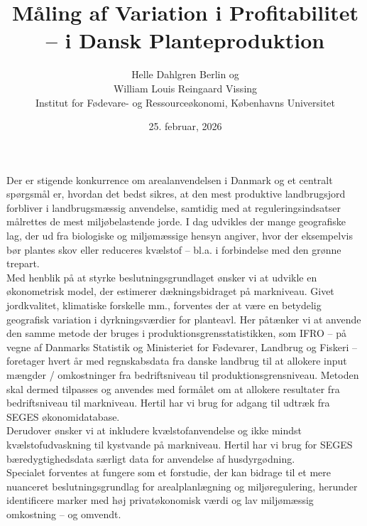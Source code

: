 \documentclass{scrartcl}
\title{Måling af Variation i Profitabilitet  \\ -- i Dansk Planteproduktion}
\author{Helle Dahlgren Berlin og \\ William Louis Reingaard Vissing \\
    \small Institut for Fødevare- og Ressourceøkonomi, Københavns Universitet}
\date{25. februar, 2026}
\begin{document}
\maketitle

\noindent
Der er stigende konkurrence om arealanvendelsen i Danmark og et centralt spørgsmål er, hvordan det bedst sikres, at den mest produktive landbrugsjord forbliver i landbrugsmæssig anvendelse, samtidig med at reguleringsindsatser målrettes de mest miljøbelastende jorde. I dag udvikles der mange geografiske lag, der ud fra biologiske og miljømæssige hensyn angiver, hvor der eksempelvis bør plantes skov eller reduceres kvælstof – bl.a. i forbindelse med den grønne trepart. \\[1em]
Med henblik på at styrke beslutningsgrundlaget ønsker vi at udvikle en økonometrisk model, der estimerer dækningsbidraget på markniveau. Givet jordkvalitet, klimatiske forskelle mm., forventes der at være en betydelig geografisk variation i dyrkningsværdier for planteavl. Her påtænker vi at anvende den samme metode der bruges i produktionsgrensstatistikken, som IFRO – på vegne af Danmarks Statistik og Ministeriet for Fødevarer, Landbrug og Fiskeri – foretager hvert år med regnskabsdata fra danske landbrug til at allokere input mængder / omkostninger fra bedriftsniveau til produktionsgrensniveau. Metoden skal dermed tilpasses og anvendes med formålet om at allokere resultater fra bedriftsniveau til markniveau. Hertil har vi brug for adgang til udtræk fra SEGES økonomidatabase. \\[1em]
Derudover ønsker vi at inkludere kvælstofanvendelse og ikke mindst kvælstofudvaskning til kystvande på markniveau. Hertil har vi brug for SEGES bæredygtighedsdata særligt data for anvendelse af husdyrgødning. \\[1em]
Specialet forventes at fungere som et forstudie, der kan bidrage til et mere nuanceret beslutningsgrundlag for arealplanlægning og miljøregulering, herunder identificere marker med høj privatøkonomisk værdi og lav miljømæssig omkostning – og omvendt.
\end{document}
